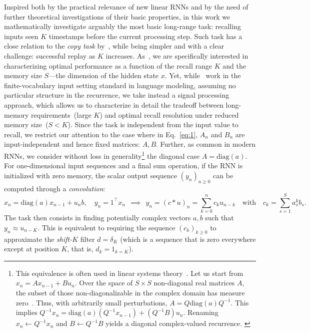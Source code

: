 Inspired both by the practical relevance of new linear RNNs and by the need of further theoretical investigations of their basic properties, in this work we mathematically investigate arguably the most basic long-range task: recalling inputs seen $K$ timestamps before the current processing step. Such task has a close relation to the \textit{copy task} by~\cite{jelassi2024repeat}, while being simpler and with a clear challenge: successful replay as $K$ increases. As~\citet{jelassi2024repeat}, we are specifically interested in characterizing optimal performance as a function of the recall range $K$ and the memory size $S$---the dimension of the hidden state $x$.  Yet, while~\citet{jelassi2024repeat} work in the finite-vocabulary input setting standard in language modeling, assuming no particular structure in the recurrence, we take instead a signal processing approach, which allows us to characterize in detail the tradeoff between long-memory requirements~(large $K$) and optimal recall resolution under reduced memory size~($S<K$). Since the task is independent from the input value to recall, we restrict our attention to the case where in Eq.~\eqref{eq:1}, $A_n$ and $B_n$ are input-independent and hence fixed matrices: $A,B$. Further, as common in modern RNNs, we consider without loss in generality\footnote{This equivalence is often used in linear systems theory~\citep{hespanha2018linear}. Let us start from $x_n = A x_{n-1} + Bu_n$. Over the space of \( S \times S \) non-diagonal real matrices $A$, the subset of those non-diagonalizable in the complex domain has measure zero~\citep{bhatia2013matrix}. Thus, with arbitrarily small perturbations, \( A = Q \text{diag}(a) Q^{-1} \). This implies $Q^{-1} x_n = \text{diag}(a) (Q^{-1} x_{n-1}) + (Q^{-1} B) u_n$. Renaming \( x_n \leftarrow Q^{-1} x_n \) and \( B \leftarrow Q^{-1} B \) yields a diagonal complex-valued recurrence. \label{diagfootnote}} the diagonal case $A = \text{diag}(a)$. For one-dimensional input sequences and a final sum operation, if the RNN is initialized with zero memory, the scalar output sequence $(y_n)_{n \geq 0}$ can be computed through a \textit{convolution}:
\begin{equation}
    x_n \!=\! \text{diag}(a) x_{n-1} + u_n b,\quad y_n \!=\! 1^\top x_n  \ \ \implies \ \ y_n = (c \ast u)_n = \sum_{k=0}^n c_k u_{n-k} \quad \text{with} \quad c_k \!=\! \sum_{s=1}^S a^k_s b_s.
    \label{eq:filter_new}
\end{equation}
The task then consists in finding potentially complex vectors $a,b$ such that $y_n \approx u_{n-K}$. This is equivalent to requiring the sequence $(c_k)_{k \geq 0}$ to approximate the \textit{shift-$K$} filter $d = \delta_{K}$ (which is a sequence that is zero everywhere except at position $K$, that is, $d_k = 1_{k=K}$). 


